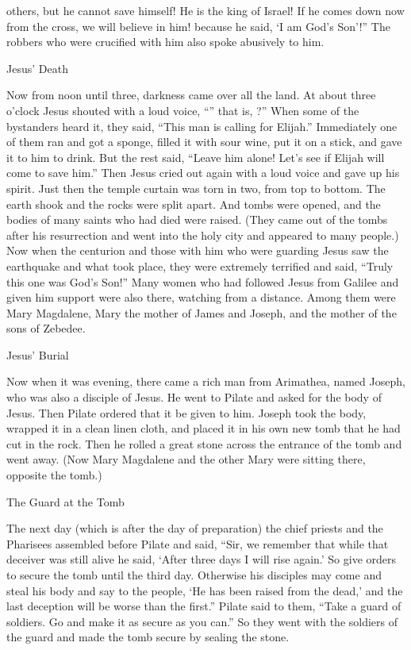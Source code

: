 {others,
but he cannot
save
himself! He is
the king
of Israel! If he comes down
now
from
the cross,
we will believe
in
him!
because
he said,
‘I am
God’s
Son’!”
The robbers
who were crucified
with
him
also spoke abusively
to him.
\par }{\SH Jesus’ Death
\par }{\PP {}Now
from
noon
until
three,
darkness
came
over
all
the land.
At about
three
o’clock
Jesus
shouted
with a loud
voice, “{}” that
is,
{}?”
When some
of the bystanders
heard
it, they said,
“This man
is calling
for Elijah.”
Immediately
one
of
them
ran
and
got a
sponge,
filled
it with sour wine,
put
it on a stick,
and gave
it to him to drink.
But
the rest
said,
“Leave
him alone! Let’s see
if
Elijah
will come
to save
him.”
Then
Jesus
cried out
again
with a loud
voice
and gave up
his spirit.
Just
then the temple
curtain
was torn
in
two,
from
top
to
bottom.
The earth
shook
and
the rocks
were split apart.
And
tombs
were opened,
and
the bodies
of many
saints
who had died
were raised.
(They
came out
of
the tombs
after
his
resurrection
and went
into
the holy
city
and
appeared
to many people.)
Now
when the centurion
and
those with
him
who were guarding
Jesus
saw
the earthquake
and
what took place,
they were
extremely
terrified
and said,
“Truly
this one
was
God’s
Son!”
Many
women
who
had followed
Jesus
from
Galilee
and given
him
support
were
also
there,
watching
from
a distance.
Among
them
were
Mary
Magdalene,
Mary
the mother
of James
and
Joseph,
and
the mother
of the sons
of Zebedee.
\par }{\SH Jesus’ Burial
\par }{\PP {}Now when
it was
evening,
there came
a rich
man
from
Arimathea,
named
Joseph,
who
was
also a disciple
of Jesus.
He
went
to Pilate
and asked
for the body
of Jesus.
Then
Pilate
ordered
that it be given to him.
Joseph
took
the body,
wrapped
it
in
a clean
linen cloth,
and
placed
it
in
his
own new
tomb
that
he had cut
in
the rock.
Then
he rolled
a great
stone
across the entrance
of the tomb
and went away.
(Now
Mary
Magdalene
and
the other
Mary
were sitting
there,
opposite
the tomb.)
\par }{\SH The Guard at the Tomb
\par }{\PP {}The next day
(which
is
after
the day of preparation) the chief priests
and
the Pharisees
assembled
before
Pilate
and said,
“Sir,
we remember
that
while that
deceiver
was
still
alive
he said,
‘After
three
days
I will rise again.’
So
give orders
to secure
the tomb
until
the third
day.
Otherwise
his disciples
may come
and steal
his body
and
say
to the people,
‘He has been raised
from
the dead,’
and
the last
deception
will be
worse than
the first.”
Pilate
said
to them,
“Take
a guard of soldiers.
Go
and make
it as secure as
you can.”
So
they went
with the soldiers of the guard
and made
the tomb
secure
by sealing
the stone.

}
